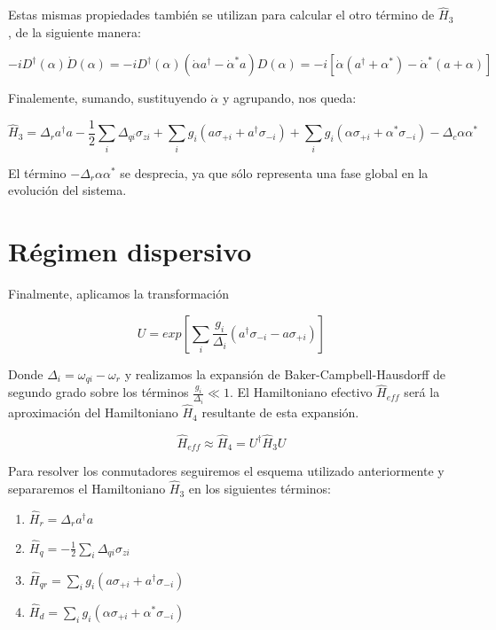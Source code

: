 Estas mismas propiedades también se utilizan para calcular el otro término de $\hat{H}_3$, de la siguiente manera:

\begin{equation}
    -i D^\dagger(\alpha) \dot{D}(\alpha) = -i D^\dagger(\alpha) (\dot{\alpha} a^\dagger - \dot{\alpha}^* a) D(\alpha) = -i[\dot{\alpha} (a^\dagger + \alpha^*) - \dot{\alpha}^* (a + \alpha)]
\end{equation}

Finalemente, sumando, sustituyendo $\dot{\alpha}$ y agrupando, nos queda:

\begin{equation}
    \hat{H}_3 = \Delta_r a^\dagger a - \frac{1}{2} \sum\limits_i \Delta_{qi} \sigma_{zi} + \sum\limits_i g_i (a \sigma_{+i} + a^\dagger \sigma_{-i}) + \sum\limits_i g_i (\alpha \sigma_{+i} + \alpha^* \sigma_{-i}) - \Delta_c \alpha \alpha^*
\end{equation}

El término $-\Delta_r \alpha \alpha^*$ se desprecia, ya que sólo representa una fase global en la evolución del sistema.

\section{Régimen dispersivo}

Finalmente, aplicamos la transformación

\begin{equation}
    U = exp[\sum\limits_i \frac{g_i} {\Delta_i} (a^\dagger \sigma_{-i} - a \sigma_{+i})]
\end{equation}

Donde $\Delta_i = \omega_{qi} - \omega_r$ y realizamos la expansión de Baker-Campbell-Hausdorff de segundo grado sobre los términos $\frac{g_i}{\Delta_i} \ll 1$. El Hamiltoniano efectivo $\hat{H}_{eff}$ será la aproximación del Hamiltoniano $\hat{H}_4$ resultante de esta expansión.

\begin{equation}
    \hat{H}_{eff} \approx \hat{H}_4 = U^\dagger \hat{H}_3 U
\end{equation}

Para resolver los conmutadores seguiremos el esquema utilizado anteriormente y separaremos el Hamiltoniano $\hat{H}_3$ en los siguientes términos:

\begin{enumerate}
    \item $\hat{H}_r = \Delta_r a^\dagger a$
    \item $\hat{H}_q = - \frac{1}{2} \sum\limits_i \Delta_{qi} \sigma_{zi}$
    \item $\hat{H}_{qr} = \sum\limits_i g_i (a \sigma_{+i} + a^\dagger \sigma_{-i})$
    \item $\hat{H}_d = \sum\limits_i g_i (\alpha \sigma_{+i} + \alpha^* \sigma_{-i})$
\end{enumerate}

